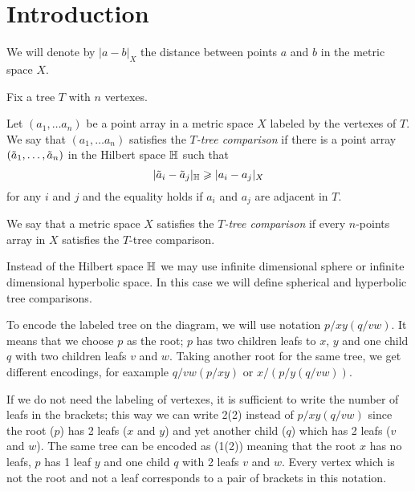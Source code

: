 \section{Introduction}\label{sec:intro}

We will denote by $|a-b|_X$ the distance between points $a$ and $b$ in the metric space $X$.

Fix a tree $T$ with $n$ vertexes.

Let $(a_1,\dots a_n)$ be a point array in a metric space $X$ labeled by the vertexes of $T$.
We say that $(a_1,\dots a_n)$  satisfies the \emph{$T$-tree comparison} if there is a point array $(\~a_1,\dots, \~a_n)$ in the Hilbert space $\HH$ such that 
\[|\~a_i-\~a_j|_\HH\ge|a_i-a_j|_X\]
for any $i$ and $j$ and the equality holds if $a_i$ and $a_j$ are adjacent in $T$.

We say that a metric space $X$ satisfies the \emph{$T$-tree comparison} if 
every $n$-points array in $X$ satisfies the $T$-tree comparison.

Instead of the Hilbert space $\HH$ we may use infinite dimensional sphere or infinite dimensional hyperbolic space.
In this case we will define spherical and hyperbolic tree comparisons.

\hide
\begin{wrapfigure}{r}{27 mm}
\end{wrapfigure}
\unhide

To encode the labeled tree on the diagram, we will use notation $p/xy(q/vw)$.
It means that we choose $p$ as the root; 
$p$ has two children leafs to $x$, $y$ and one child $q$ with two children leafs $v$ and $w$.
Taking another root for the same tree, we get different encodings, for eaxample $q/vw(p/xy)$ or $x/(p/y(q/vw))$.

If we do not need the labeling of vertexes,
it is sufficient to write the number of leafs in the brackets;
this way we can write 2(2) instead of $p/xy(q/vw)$ since the root ($p$) has 2 leafs ($x$ and $y$) and yet another child ($q$) which has 2 leafs ($v$ and $w$).  
The same tree can be encoded as (1(2)) meaning that the root $x$ has no leafs, 
$p$ has 1 leaf $y$ and one child $q$ with 2 leafs $v$ and $w$.
Every vertex which is not the root and not a leaf corresponds to a pair of brackets in this notation.

